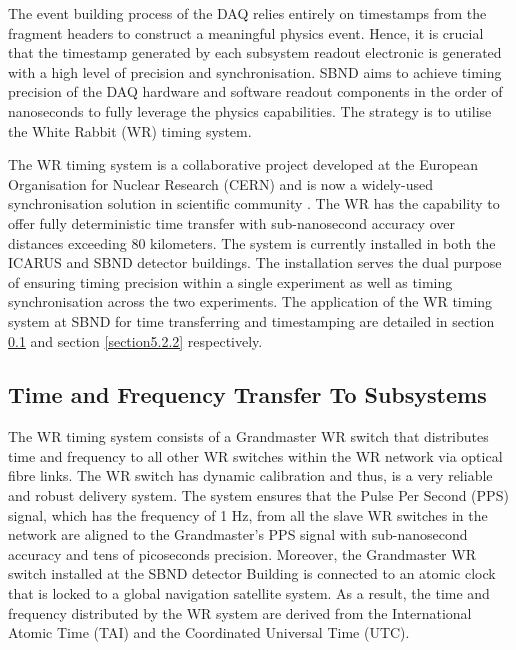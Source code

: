 The event building process of the DAQ relies entirely on timestamps from the fragment headers to construct a meaningful physics event.
Hence, it is crucial that the timestamp generated by each subsystem readout electronic is generated with a high level of precision and synchronisation.
SBND aims to achieve timing precision of the DAQ hardware and software readout components in the order of nanoseconds to fully leverage the physics capabilities.
The strategy is to utilise the White Rabbit (WR) timing system.

The WR timing system is a collaborative project developed at the European Organisation for Nuclear Research (CERN) and is now a widely-used synchronisation solution in scientific community \cite{WR_paper}.
The WR has the capability to offer fully deterministic time transfer with sub-nanosecond accuracy over distances exceeding 80 kilometers.
The system is currently installed in both the ICARUS and SBND detector buildings.
The installation serves the dual purpose of ensuring timing precision within a single experiment as well as timing synchronisation across the two experiments. 
The application of the WR timing system at SBND for time transferring and timestamping are detailed in section \ref{section5.2.1} and section \ref{section5.2.2} respectively.

\subsection{Time and Frequency Transfer To Subsystems}
\label{section5.2.1}

The WR timing system consists of a Grandmaster WR switch that distributes time and frequency to all other WR switches within the WR network via optical fibre links.
The WR switch has dynamic calibration and thus, is a very reliable and robust delivery system.
The system ensures that the Pulse Per Second (PPS) signal, which has the frequency of 1 Hz, from all the slave WR switches in the network are aligned to the Grandmaster's PPS signal with sub-nanosecond accuracy and tens of picoseconds precision. 
Moreover, the Grandmaster WR switch installed at the SBND detector Building is connected to an atomic clock that is locked to a global navigation satellite system. 
As a result, the time and frequency distributed by the WR system are derived from the International Atomic Time (TAI) and the Coordinated Universal Time (UTC).


